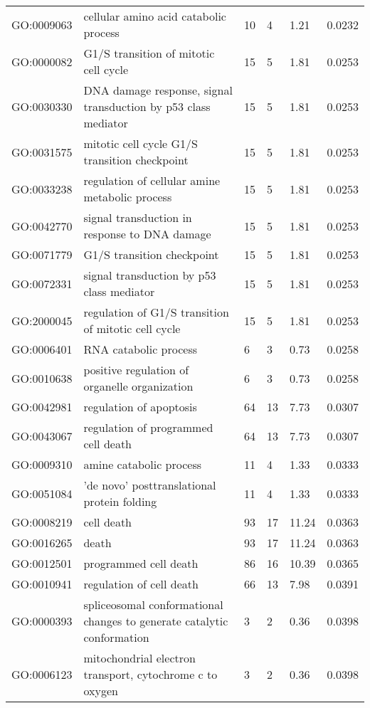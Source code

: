 \documentclass[10pt]{bmc_article}
\newenvironment{bmcformat}{\begin{raggedright}\baselineskip20pt\sloppy\setboolean{publ}{false}}{\end{raggedright}\baselineskip20pt\sloppy}
\begin{document}
\begin{bmcformat}
\begin{longtable}{lp{3cm}llll}
  GO:0009063 & cellular amino acid catabolic process &  10 &   4 & 1.21 & 0.0232 \\ 
  GO:0000082 & G1/S transition of mitotic cell cycle &  15 &   5 & 1.81 & 0.0253 \\ 
  GO:0030330 & DNA damage response, signal transduction by p53 class mediator &  15 &   5 & 1.81 & 0.0253 \\ 
  GO:0031575 & mitotic cell cycle G1/S transition checkpoint &  15 &   5 & 1.81 & 0.0253 \\ 
  GO:0033238 & regulation of cellular amine metabolic process &  15 &   5 & 1.81 & 0.0253 \\ 
  GO:0042770 & signal transduction in response to DNA damage &  15 &   5 & 1.81 & 0.0253 \\ 
  GO:0071779 & G1/S transition checkpoint &  15 &   5 & 1.81 & 0.0253 \\ 
  GO:0072331 & signal transduction by p53 class mediator &  15 &   5 & 1.81 & 0.0253 \\ 
  GO:2000045 & regulation of G1/S transition of mitotic cell cycle &  15 &   5 & 1.81 & 0.0253 \\ 
  GO:0006401 & RNA catabolic process &   6 &   3 & 0.73 & 0.0258 \\ 
  GO:0010638 & positive regulation of organelle organization &   6 &   3 & 0.73 & 0.0258 \\ 
  GO:0042981 & regulation of apoptosis &  64 &  13 & 7.73 & 0.0307 \\ 
  GO:0043067 & regulation of programmed cell death &  64 &  13 & 7.73 & 0.0307 \\ 
  GO:0009310 & amine catabolic process &  11 &   4 & 1.33 & 0.0333 \\ 
  GO:0051084 & 'de novo' posttranslational protein folding &  11 &   4 & 1.33 & 0.0333 \\ 
  GO:0008219 & cell death &  93 &  17 & 11.24 & 0.0363 \\ 
  GO:0016265 & death &  93 &  17 & 11.24 & 0.0363 \\ 
  GO:0012501 & programmed cell death &  86 &  16 & 10.39 & 0.0365 \\ 
  GO:0010941 & regulation of cell death &  66 &  13 & 7.98 & 0.0391 \\ 
  GO:0000393 & spliceosomal conformational changes to generate catalytic conformation &   3 &   2 & 0.36 & 0.0398 \\ 
  GO:0006123 & mitochondrial electron transport, cytochrome c to oxygen &   3 &   2 & 0.36 & 0.0398 \\ 

\end{longtable}
\end{bmcformat}
\end{document}
